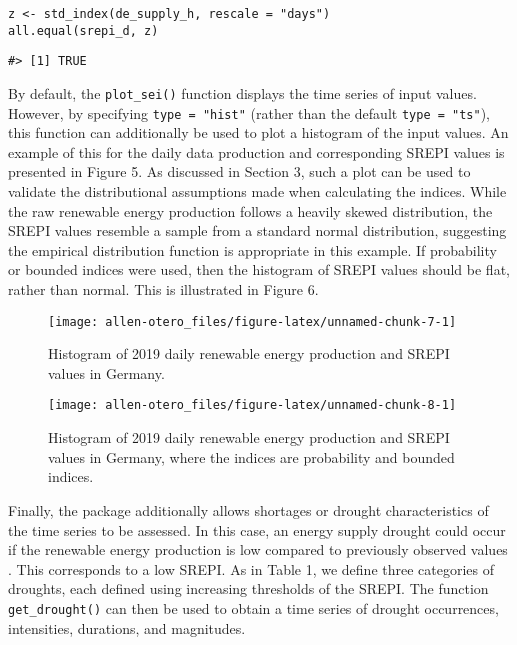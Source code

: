 \begin{verbatim}
z <- std_index(de_supply_h, rescale = "days")
all.equal(srepi_d, z)
\end{verbatim}

\begin{verbatim}
#> [1] TRUE
\end{verbatim}

By default, the \texttt{plot\_sei()} function displays the time series of input values. However, by specifying \texttt{type\ =\ "hist"} (rather than the default \texttt{type\ =\ "ts"}), this function can additionally be used to plot a histogram of the input values. An example of this for the daily data production and corresponding SREPI values is presented in Figure 5. As discussed in Section 3, such a plot can be used to validate the distributional assumptions made when calculating the indices. While the raw renewable energy production follows a heavily skewed distribution, the SREPI values resemble a sample from a standard normal distribution, suggesting the empirical distribution function is appropriate in this example. If probability or bounded indices were used, then the histogram of SREPI values should be flat, rather than normal. This is illustrated in Figure 6.

\begin{figure}

{\centering \texttt{[image: allen-otero\_files/figure-latex/unnamed-chunk-7-1]} 

}

\caption{Histogram of 2019 daily renewable energy production and SREPI values in Germany.}\label{fig:unnamed-chunk-7}
\end{figure}

\begin{figure}

{\centering \texttt{[image: allen-otero\_files/figure-latex/unnamed-chunk-8-1]} 

}

\caption{Histogram of 2019 daily renewable energy production and SREPI values in Germany, where the indices are probability and bounded indices.}\label{fig:unnamed-chunk-8}
\end{figure}

Finally, the  package additionally allows shortages or drought characteristics of the time series to be assessed. In this case, an energy supply drought could occur if the renewable energy production is low compared to previously observed values \citep{AllenOtero2023}. This corresponds to a low SREPI. As in Table 1, we define three categories of droughts, each defined using increasing thresholds of the SREPI. The function \texttt{get\_drought()} can then be used to obtain a time series of drought occurrences, intensities, durations, and magnitudes.

